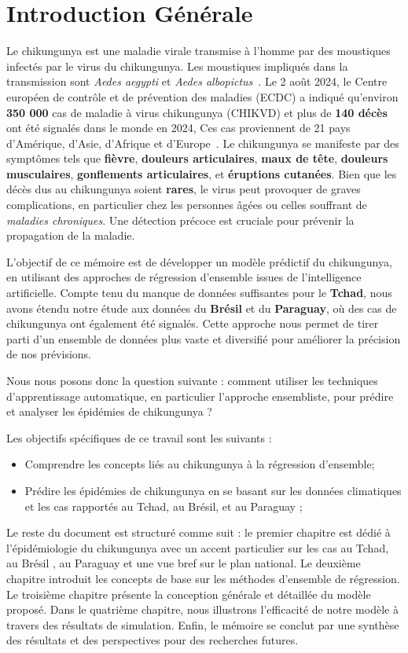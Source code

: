 \chapter*{Introduction Générale}
Le chikungunya est une maladie virale transmise à l'homme par des moustiques infectés par le virus du chikungunya. Les moustiques impliqués dans la transmission sont \textit{Aedes aegypti} et \textit{Aedes albopictus}~\cite{intro}. Le 2 août 2024, le Centre européen de contrôle et de prévention des maladies (ECDC) a indiqué qu'environ \textbf{350 000} cas de maladie à virus chikungunya (CHIKVD) et plus de \textbf{140 décès} ont été signalés dans le monde en 2024, Ces cas proviennent de 21 pays d'Amérique, d'Asie, d'Afrique et d'Europe~\cite{chikvecdc}. Le chikungunya se manifeste par des symptômes tels que \textbf{fièvre}, \textbf{douleurs articulaires}, \textbf{maux de tête}, \textbf{douleurs musculaires}, \textbf{gonflements articulaires}, et \textbf{éruptions cutanées}. Bien que les décès dus au chikungunya soient \textbf{rares}, le virus peut provoquer de graves complications, en particulier chez les personnes âgées ou celles souffrant de \textit{maladies chroniques}. Une détection précoce est cruciale pour prévenir la propagation de la maladie.

L'objectif de ce mémoire est de développer un modèle prédictif du chikungunya, en utilisant des approches de régression d'ensemble issues de l'intelligence artificielle. Compte tenu du manque de données suffisantes pour le \textbf{Tchad}, nous avons étendu notre étude aux données du \textbf{Brésil} et du \textbf{Paraguay}, où des cas de chikungunya ont également été signalés. Cette approche nous permet de tirer parti d'un ensemble de données plus vaste et diversifié pour améliorer la précision de nos prévisions.

Nous nous posons donc la question suivante : comment utiliser les techniques d'apprentissage automatique, en particulier l'approche ensembliste, pour prédire et analyser les épidémies de chikungunya ?

Les objectifs spécifiques de ce travail sont les suivants :
\begin{itemize}
	\item Comprendre les concepts liés au chikungunya à la régression d'ensemble;
	\item Prédire les épidémies de chikungunya en se basant sur les données climatiques et les cas rapportés au Tchad, au Brésil, et au Paraguay ;
\end{itemize}

Le reste du document est structuré comme suit : le premier chapitre est dédié à l'épidémiologie du chikungunya avec un accent particulier sur les cas au Tchad, au Brésil , au Paraguay et une vue bref sur le plan national. Le deuxième chapitre introduit les concepts de base sur les méthodes d'ensemble de régression. Le troisième chapitre présente la conception générale et détaillée du modèle proposé. Dans le quatrième chapitre, nous illustrons l'efficacité de notre modèle à travers des résultats de simulation. Enfin, le mémoire se conclut par une synthèse des résultats et des perspectives pour des recherches futures.

